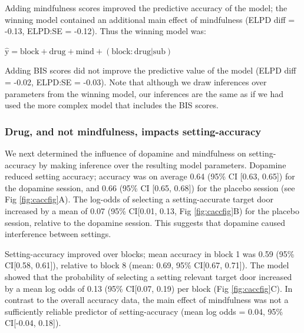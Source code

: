 \documentclass{article}
\begin{document}
Adding mindfulness scores improved the predictive accuracy of the model;
the winning model contained an additional main effect of mindfulness
(ELPD diff = -0.13, ELPD:SE = -0.12). Thus the winning model was:

\(\mathrm{\hat{y}} = \mathrm{block} + \mathrm{drug} + \mathrm{mind} + \mathrm{(block:drug|sub)}\)

Adding BIS scores did not improve the predictive value of the model
(ELPD diff = -0.02, ELPD:SE = -0.03). Note that although we draw
inferences over parameters from the winning model, our inferences are
the same as if we had used the more complex model that includes the BIS
scores.

\hypertarget{drug-and-not-mindfulness-impacts-setting-accuracy}{%
\subsubsection{Drug, and not mindfulness, impacts
setting-accuracy}\label{drug-and-not-mindfulness-impacts-setting-accuracy}}

We next determined the influence of dopamine and mindfulness on
setting-accuracy by making inference over the resulting model
parameters. Dopamine reduced setting accuracy; accuracy was on average
0.64 (95\% CI {[}0.63, 0.65{]}) for the dopamine session, and 0.66 (95\%
CI {[}0.65, 0.68{]}) for the placebo session (see Fig
\ref{fig:caccfig}A). The log-odds of selecting a setting-accurate target
door increased by a mean of 0.07 (95\% CI{[}0.01, 0.13, Fig
\ref{fig:caccfig}B) for the placebo session, relative to the dopamine
session. This suggests that dopamine caused interference between
settings.

Setting-accuracy improved over blocks; mean accuracy in block 1 was 0.59
(95\% CI{[}0.58, 0.61{]}), relative to block 8 (mean: 0.69, 95\%
CI{[}0.67, 0.71{]}). The model showed that the probability of selecting
a setting relevant target door increased by a mean log odds of 0.13
(95\% CI{[}0.07, 0.19) per block (Fig \ref{fig:caccfig}C). In contrast
to the overall accuracy data, the main effect of mindfulness was not a
sufficiently reliable predictor of setting-accuracy (mean log odds =
0.04, 95\% CI{[}-0.04, 0.18{]}).
\end{document}
